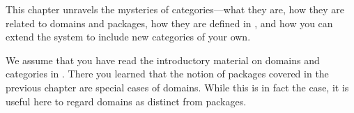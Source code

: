 
%
%
%
%
%



This chapter unravels the mysteries of categories---what
they are, how they are related to domains and packages,
how they are defined in \Language{}, and how you can extend the
system to include new categories of your own.

We assume that you have read the introductory material on domains
and categories in .
There you learned that the notion of packages covered in the
previous chapter are special cases of domains.
While this is in fact the case, it is useful here to regard domains
as distinct from packages.

